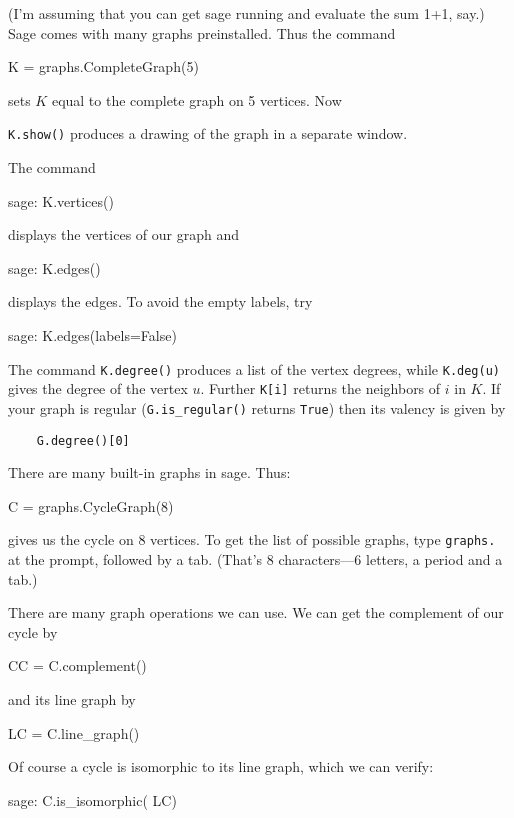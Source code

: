 (I'm assuming that you can get sage running and evaluate the sum 1+1, say.)
Sage comes with many graphs preinstalled.  Thus the command
    \begin{sageblock}
        K = graphs.CompleteGraph(5)
    \end{sageblock}
sets $K$ equal to the complete graph on 5 vertices.  Now 
{\verb|K.show()| produces a drawing of the graph in a separate window. 

The command
\begin{sageexample}
    sage: K.vertices()
\end{sageexample}
displays the vertices of our graph and
\begin{sageexample}
    sage: K.edges() 
\end{sageexample}
displays the edges. To avoid the empty labels, try
\begin{sageexample}
    sage: K.edges(labels=False)
\end{sageexample}

The command \verb|K.degree()| produces a list of the vertex degrees,
while \verb|K.deg(u)| gives the degree of the vertex $u$. Further 
\verb|K[i]| returns the neighbors of $i$ in $K$. If your graph is
regular (\verb|G.is_regular()| returns \verb|True|) then its valency
is given by
\begin{verbatim}
    G.degree()[0]
\end{verbatim}

There are many built-in graphs in sage. Thus:
\begin{sageblock}
    C = graphs.CycleGraph(8)
\end{sageblock}
gives us the cycle on 8 vertices. To get the list of possible graphs,
type \verb|graphs.| at the prompt, followed by a tab. (That's 8 characters---6 letters,
a period and a tab.)

There are many graph operations we can use. We can get the complement of
our cycle by
\begin{sageblock}
    CC = C.complement()
\end{sageblock}
and its line graph by
\begin{sageblock}
    LC = C.line_graph()
\end{sageblock}
Of course a cycle is isomorphic to its line graph, which we can verify:
\begin{sageexample}
    sage: C.is_isomorphic( LC)
\end{sageexample}

}
